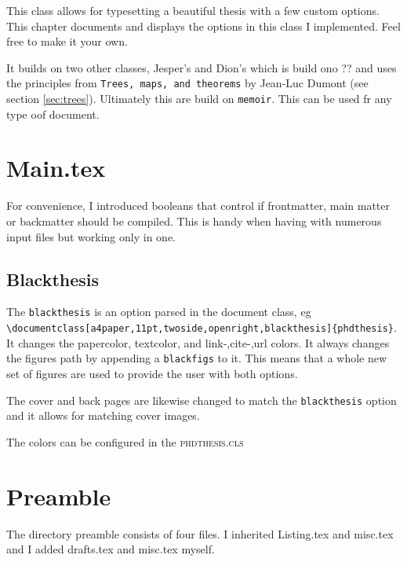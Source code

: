 \label{chap:doc}




This class allows for typesetting a beautiful thesis with a few custom options. This chapter documents and displays the options in this class I implemented. Feel free to make it your own.

It builds on two other classes, Jesper's and Dion's which is build ono ?? and uses the principles from \texttt{Trees, maps, and theorems} by Jean-Luc Dumont (see section \ref{sec:trees}). Ultimately this are build on \texttt{memoir}. This can be used fr any type oof document.

\section{Main.tex}

For convenience, I introduced booleans that control if frontmatter, main matter or backmatter should be compiled. This is handy when having with numerous input files but working only in one.

\subsection{Blackthesis}
The \texttt{blackthesis} is an option parsed in the document class, eg \texttt{\textbackslash documentclass[a4paper,11pt,twoside,openright,blackthesis]\{phdthesis\}}. It changes the papercolor, textcolor, and link-,cite-,url colors. It always changes the figures path by appending a \texttt{blackfigs} to it. This means that a whole new set of figures are used to provide the user with both options.

The cover and back pages are likewise changed to match the \texttt{blackthesis} option and it allows for matching cover images.

The colors can be configured in the \textsc{phdthesis.cls}


\section{Preamble}
The directory preamble consists of four files. I inherited Listing.tex and misc.tex and I added drafts.tex and misc.tex myself.


